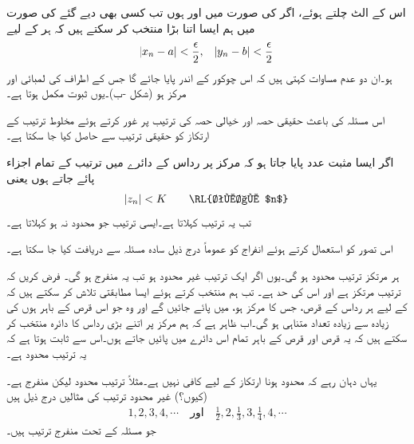 اس کے  الٹ چلتے ہوئے، اگر  کی صورت میں  اور  ہوں  تب کسی بھی دیے گئے  کی صورت میں ہم ایسا  اتنا بڑا منتخب کر سکتے ہیں کہ ہر  کے لیے 
\begin{align*}
\abs{x_n-a}<\frac{\epsilon}{2},\quad \abs{y_n-b}<\frac{\epsilon}{2}
\end{align*}
ہو۔ان دو عدم مساوات کہتی ہیں کہ  اس چوکور کے اندر پایا جائے گا جس کے اطراف کی لمبائی  اور مرکز  ہو (شکل -ب)۔یوں ثبوت مکمل ہوتا ہے۔

اس مسئلہ کی باعث حقیقی حصہ اور خیالی حصہ کی ترتیب پر غور کرتے ہوئے مخلوط ترتیب کے ارتکاز کو حقیقی ترتیب سے حاصل کیا جا سکتا ہے۔

اگر ایسا مثبت عدد  پایا جاتا ہو کہ مرکز پر رداس  کے دائرے میں ترتیب  کے تمام اجزاء  پائے جاتے ہوں  یعنی
\begin{align*}
\abs{z_n}<K \quad \quad \text{\RL{تمام $n$}}
\end{align*}
تب یہ ترتیب  کہلاتا  ہے۔ایسی ترتیب جو محدود نہ ہو  کہلاتا ہے۔

اس تصور کو استعمال کرتے ہوئے انفراج  کو عموماً درج ذیل سادہ مسئلہ  سے دریافت کیا جا سکتا ہے۔

ہر مرتکز ترتیب محدود ہو گی۔یوں اگر ایک ترتیب غیر محدود ہو تب یہ منفرج ہو گی۔
فرض کریں کہ ترتیب  مرتکز ہے اور اس کی حد  ہے۔ تب ہم  منتخب کرتے ہوئے ایسا مطابقتی  تلاش کر سکتے ہیں کہ   کے لیے ہر  رداس  کے قرص، جس کا مرکز  ہو، میں پائے جائیں گے اور وہ   جو اس قرص کے باہر ہوں کی زیادہ سے زیادہ تعداد متناہی ہو گی۔اب ظاہر ہے کہ ہم مرکز پر اتنے بڑی  رداس  کا دائرہ منتخب کر سکتے ہیں کہ یہ قرص اور قرص کے باہر تمام  اس دائرے میں پائیں جاتے ہوں۔اس سے ثابت ہوتا ہے کہ یہ ترتیب محدود ہے۔

یہاں دہان رہے کہ محدود ہونا ارتکاز کے لیے کافی نہیں ہے۔مثلاً ترتیب  محدود  لیکن منفرج ہے۔ (کیوں؟) غیر محدود ترتیب کی مثالیں درج ذیل ہیں
\begin{align*}
1,2,3,4,\cdots\quad \text{اور}\quad \frac{1}{2},2,\frac{1}{3},3,\frac{1}{4},4,\cdots
\end{align*} 
جو مسئلہ  کے تحت منفرج ترتیب ہیں۔


